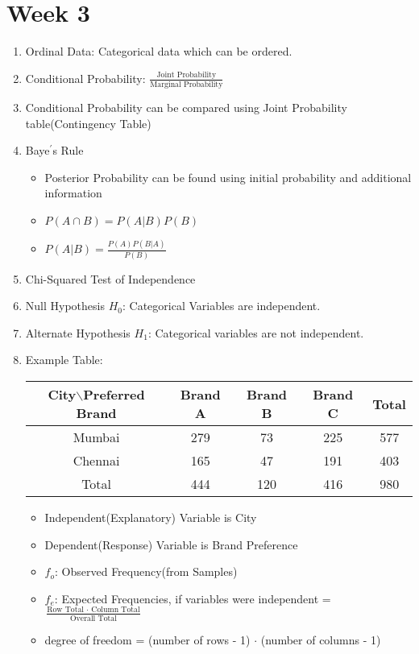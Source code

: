 \documentclass[a4paper]{article}
\begin{document}
\section{Week 3}
	\begin{enumerate}
		\item Ordinal Data: Categorical data which can be ordered.
		\item Conditional Probability: $\frac{\text{Joint Probability}}{\text{Marginal Probability}}$
		\item Conditional Probability can be compared using Joint Probability table(Contingency Table)
		\item Baye$^{'}$s Rule
		\begin{itemize}
			\item Posterior Probability can be found using initial probability and additional information
			\item $P(A\cap B) = P(A|B)P(B)$
			\item $P(A|B) = \frac{P(A)P(B|A)}{P(B)}$
		\end{itemize}
		\item Chi-Squared Test of Independence
		\item Null Hypothesis $H_0$: Categorical Variables are independent.
		\item Alternate Hypothesis $H_1$: Categorical variables are not independent.
		\item Example Table:
		
		\begin{tabular}{|c||c|c|c||c|}
			\hline
			City$\backslash$Preferred Brand& Brand A& Brand B& Brand C& Total\\
			\hline \hline
			Mumbai& 279& 73& 225& 577\\
			\hline
			Chennai& 165& 47& 191& 403\\
			\hline \hline
			Total& 444& 120& 416& 980\\
			\hline
		\end{tabular}
		\begin{itemize}
			\item Independent(Explanatory) Variable is City
			\item Dependent(Response) Variable is Brand Preference
			\item $f_{o}$: Observed Frequency(from Samples)
			\item $f_{e}$: Expected Frequencies, if variables were independent = $\frac{\text{Row Total $\cdot$ Column Total}}{\text{Overall Total}}$
			\item degree of freedom = (number of rows - 1) $\cdot$ (number of columns - 1)
		\end{itemize}
	\end{enumerate}
\end{document}
